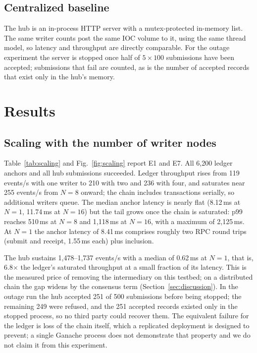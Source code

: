 \documentclass[conference]{IEEEtran}
\begin{document}
\subsection{Centralized baseline}
The hub is an in-process HTTP server with a mutex-protected in-memory list. The same writer counts post the same IOC volume to it, using the same thread model, so latency and throughput are directly comparable. For the outage experiment the server is stopped once half of $5\times100$ submissions have been accepted; submissions that fail are counted, as is the number of accepted records that exist only in the hub's memory.

\section{Results}
\label{sec:results}

\subsection{Scaling with the number of writer nodes}
\label{sec:res-scale}
Table~\ref{tab:scaling} and Fig.~\ref{fig:scaling} report E1 and E7. All 6,200 ledger anchors and all hub submissions succeeded. Ledger throughput rises from 119 events/s with one writer to 210 with two and 236 with four, and saturates near 255 events/s from $N=8$ onward; the chain includes transactions serially, so additional writers queue. The median anchor latency is nearly flat (8.12\,ms at $N=1$, 11.74\,ms at $N=16$) but the tail grows once the chain is saturated: p99 reaches 510\,ms at $N=8$ and 1,118\,ms at $N=16$, with a maximum of 2,125\,ms. At $N=1$ the anchor latency of 8.41\,ms comprises roughly two RPC round trips (submit and receipt, 1.55\,ms each) plus inclusion.

The hub sustains 1,478--1,737 events/s with a median of 0.62\,ms at $N=1$, that is, 6.8$\times$ the ledger's saturated throughput at a small fraction of its latency. This is the measured price of removing the intermediary on this testbed; on a distributed chain the gap widens by the consensus term (Section~\ref{sec:discussion}). In the outage run the hub accepted 251 of 500 submissions before being stopped; the remaining 249 were refused, and the 251 accepted records existed only in the stopped process, so no third party could recover them. The equivalent failure for the ledger is loss of the chain itself, which a replicated deployment is designed to prevent; a single Ganache process does not demonstrate that property and we do not claim it from this experiment.
\end{document}
